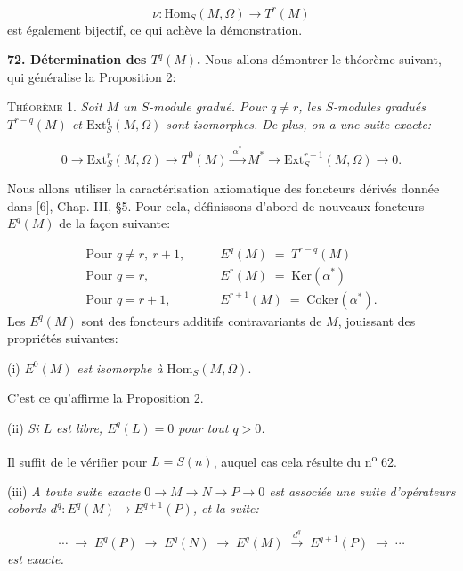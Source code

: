 \begin{equation*}
\nu\colon \mathrm{Hom}_S(M, \Omega) \to T^r(M)
\end{equation*}
est également bijectif, ce qui achève la démonstration.

\textbf{72. Détermination des $T^q(M)$.} Nous allons démontrer le théorème suivant, qui généralise la Proposition 2:

\textsc{Théorème} 1. \textit{Soit $M$ un $S$-module gradué. Pour $q \neq r$, les $S$-modules gradués $T^{r-q}(M)$ et $\mathrm{Ext}_S^q(M, \Omega)$ sont isomorphes. De plus, on a une suite exacte:}

\begin{equation*}
0 \to \mathrm{Ext}_S^r(M, \Omega) \to T^0(M) \xrightarrow{\ \alpha^*\ } M^* \to \mathrm{Ext}_S^{r+1}(M, \Omega) \to 0.
\end{equation*}


Nous allons utiliser la caractérisation axiomatique des foncteurs dérivés donnée dans [6], Chap. III, §5. Pour cela, définissons d'abord de nouveaux foncteurs $E^q(M)$ de la façon suivante:

\begin{equation*}
\begin{array}{ll}
\text{Pour } q \neq r,\ r + 1, \qquad & E^q(M) \;=\; T^{r-q}(M) \\[4pt]
\text{Pour } q = r, \qquad & E^r(M) \;=\; \mathrm{Ker}(\alpha^*) \\[4pt]
\text{Pour } q = r + 1, \qquad & E^{r+1}(M) \;=\; \mathrm{Coker}(\alpha^*).
\end{array}
\end{equation*}
Les $E^q(M)$ sont des foncteurs additifs contravariants de $M$, jouissant des propriétés suivantes:

(i) $E^0(M)$ \textit{est isomorphe à} $\mathrm{Hom}_S(M, \Omega)$.

C'est ce qu'affirme la Proposition 2.

(ii) \textit{Si $L$ est libre, $E^q(L) = 0$ pour tout $q > 0$.}

Il suffit de le vérifier pour $L = S(n)$, auquel cas cela résulte du n\textsuperscript{o} 62.

(iii) \textit{A toute suite exacte $0 \to M \to N \to P \to 0$ est associée une suite d'opérateurs cobords $d^q\colon E^q(M) \to E^{q+1}(P)$, et la suite:}

\begin{equation*}
\cdots \;\to\; E^q(P) \;\to\; E^q(N) \;\to\; E^q(M) \;\xrightarrow{\ d^q\ }\; E^{q+1}(P) \;\to\; \cdots
\end{equation*}
\textit{est exacte.}

